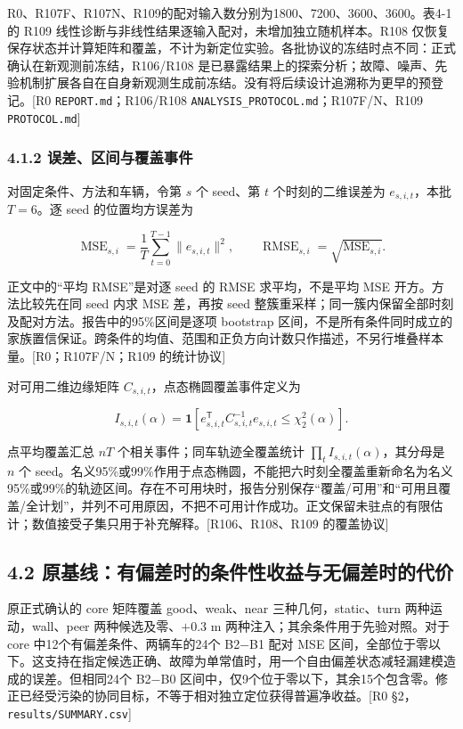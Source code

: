 \documentclass[12pt,a4paper]{article}
\begin{document}
R0、R107F、R107N、R109的配对输入数分别为1800、7200、3600、3600。表4-1的
R109 线性诊断与非线性结果逐输入配对，未增加独立随机样本。R108
仅恢复保存状态并计算矩阵和覆盖，不计为新定位实验。各批协议的冻结时点不同：正式确认在新观测前冻结，R106/R108
是已暴露结果上的探索分析；故障、噪声、先验机制扩展各自在自身新观测生成前冻结。没有将后续设计追溯称为更早的预登记。{[}R0
\texttt{REPORT.md}；R106/R108
\texttt{ANALYSIS\_PROTOCOL.md}；R107F/N、R109 \texttt{PROTOCOL.md}{]}

\subsubsection{4.1.2
误差、区间与覆盖事件}\label{ux8befux5deeux533aux95f4ux4e0eux8986ux76d6ux4e8bux4ef6}

对固定条件、方法和车辆，令第 \(s\) 个 seed、第 \(t\) 个时刻的二维误差为
\(e_{s,i,t}\)，本批 \(T=6\)。逐 seed 的位置均方误差为

\[\operatorname{MSE}_{s,i}=\frac{1}{T}\sum_{t=0}^{T-1}\|e_{s,i,t}\|^2,
\qquad \operatorname{RMSE}_{s,i}=\sqrt{\operatorname{MSE}_{s,i}}.\]

正文中的``平均 RMSE''是对逐 seed 的 RMSE 求平均，不是平均 MSE
开方。方法比较先在同 seed 内求 MSE 差，再按 seed
整簇重采样；同一簇内保留全部时刻及配对方法。报告中的95\%区间是逐项
bootstrap
区间，不是所有条件同时成立的家族置信保证。跨条件的均值、范围和正负方向计数只作描述，不另行堆叠样本量。{[}R0；R107F/N；R109
的统计协议{]}

对可用二维边缘矩阵 \(C_{s,i,t}\)，点态椭圆覆盖事件定义为

\[I_{s,i,t}(\alpha)=\mathbf{1}\!\left[e_{s,i,t}^{\mathsf T}C_{s,i,t}^{-1}e_{s,i,t}
\leq\chi^2_2(\alpha)\right].\]

点平均覆盖汇总 \(nT\) 个相关事件；同车轨迹全覆盖统计
\(\prod_t I_{s,i,t}(\alpha)\)，其分母是 \(n\) 个
seed。名义95\%或99\%作用于点态椭圆，不能把六时刻全覆盖重新命名为名义95\%或99\%的轨迹区间。存在不可用块时，报告分别保存``覆盖/可用''和``可用且覆盖/全计划''，并列不可用原因，不把不可用计作成功。正文保留未驻点的有限估计；数值接受子集只用于补充解释。{[}R106、R108、R109
的覆盖协议{]}

\subsection{4.2
原基线：有偏差时的条件性收益与无偏差时的代价}\label{ux539fux57faux7ebfux6709ux504fux5deeux65f6ux7684ux6761ux4ef6ux6027ux6536ux76caux4e0eux65e0ux504fux5deeux65f6ux7684ux4ee3ux4ef7}

原正式确认的 core 矩阵覆盖 good、weak、near 三种几何，static、turn
两种运动，wall、peer 两种候选及零、\(+0.3\) m
两种注入；其余条件用于先验对照。对于 core 中12个有偏差条件、两辆车的24个
B2−B1 配对 MSE
区间，全部位于零以下。这支持在指定候选正确、故障为单常值时，用一个自由偏差状态减轻漏建模造成的误差。但相同24个
B2−B0
区间中，仅9个位于零以下，其余15个包含零。修正已经受污染的协同目标，不等于相对独立定位获得普遍净收益。{[}R0
§2，\texttt{results/SUMMARY.csv}{]}
\end{document}
